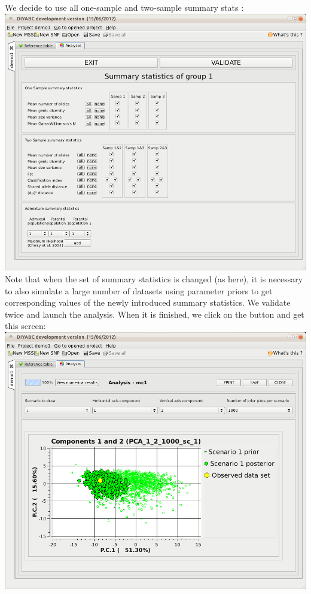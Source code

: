 We decide to use all one-sample and two-sample summary stats :\\


\includegraphics[scale=0.35]{gui_pictures/Capture-DIYABC-57} \\


Note that when the set of summary statistics is changed (as here),
it is necessary to also simulate a large number of datasets using
parameter priors to get corresponding values of the newly introduced
summary statistics. We validate twice and launch the analysis. When
it is finished, we click on the  button
and get this screen:\\


\includegraphics[scale=0.33]{gui_pictures/Capture-DIYABC-58} \\


